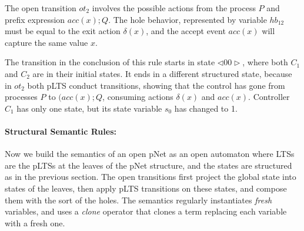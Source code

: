 \documentclass{lncs/llncs}
\newcommand\ostate[1]{\triangleleft{#1}\triangleright}
\begin{document}
The open transition $ot_2$ involves the possible actions from the process $P$ and prefix expression $acc(x);Q$. The hole behavior, represented by variable $hb_{12}$ must be equal to the exit action $\delta(x)$, and the accept event $acc(x)$ will capture the same value $x$.

The transition in the conclusion of this rule starts in
state $\ostate{00}$, where both $C_1$ and $C_2$ are in their initial
states. It ends in a different structured state, because in $ot_2$
both pLTS conduct transitions, showing that the control has gone from
processes $P$ to $(acc(x);Q$, consuming actions $\delta(x)$ and
$acc(x)$. Controller $C_1$ has only one state, but its state variable
$s_0$ has changed to 1.


\paragraph{Structural Semantic Rules:}
Now we build the semantics of an open pNet as an open automaton where
LTSs are the pLTSs at 
the leaves of the pNet structure, and the states are structured as in
the previous section. 
The open transitions first
 project the global state into states of the leaves, then apply
pLTS transitions on these states, and compose them with the sort of the holes. %
The semantics   regularly instantiates \emph{fresh} variables, and uses a
\emph{clone} operator that clones a term replacing each variable with a
fresh one.
\end{document}
